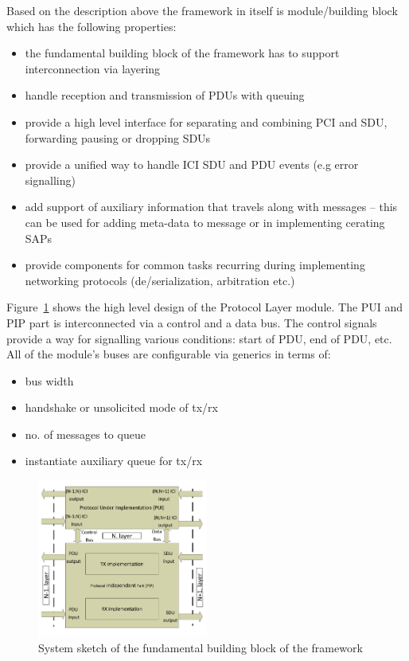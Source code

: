 \documentclass[conference]{IEEEtran}
\begin{document}
Based on the description above the framework in itself is module/building block which has the following properties: 

\begin{itemize}
\renewcommand \labelitemi{--}
\item the fundamental building block of the framework has to support interconnection via layering
\item handle reception and transmission of PDUs with queuing 
\item provide a high level interface for separating and combining PCI and SDU, forwarding pausing or dropping SDUs
\item provide a unified way to handle ICI SDU and PDU events (e.g error signalling)
\item add support of auxiliary information that travels along with messages -- this can be used for adding meta-data to message or in implementing cerating SAPs
\item provide components for common tasks recurring during implementing networking protocols (de/serialization, arbitration etc.)
\end{itemize}

Figure~\ref{fig:system_sketch} shows the high level design of the Protocol Layer module. The PUI and PIP part is interconnected via a control and a data bus. The control signals provide a way for signalling various conditions: start of PDU, end of PDU, etc. All of the module's buses are configurable via generics in terms of:
\begin{itemize}
\renewcommand \labelitemi{--}
\item bus width
\item handshake or unsolicited mode of tx/rx
\item no. of messages to queue
\item instantiate auxiliary queue for tx/rx
\end{itemize}

\begin{figure}[!htb]
    \centering
    \includegraphics[width=0.5\textwidth]{figures_raw/system_sketch.pdf}
    \caption{System sketch of the fundamental building block of the framework}
    \label{fig:system_sketch}
\end{figure}
\end{document}
